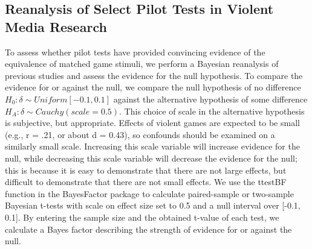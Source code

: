 \documentclass[fignum,nobf,man]{apa}
\begin{document}
\subsection{Reanalysis of Select Pilot Tests in Violent Media Research}
To assess whether pilot tests have provided convincing evidence of the equivalence of matched game stimuli, we perform a Bayesian reanalysis of previous studies and assess the evidence for the null hypothesis. To compare the evidence for or against the null, we compare the null hypothesis of no difference $H_0: \delta \sim Uniform[-0.1, 0.1]$ %
against the alternative hypothesis of some difference $H_A: \delta \sim Cauchy(scale = 0.5)$. This choice of scale in the alternative hypothesis is subjective, but appropriate. Effects of violent games are expected to be small (e.g., r = .21, or about d = 0.43), so confounds should be examined on a similarly small scale. Increasing this scale variable will increase evidence for the null, while decreasing this scale variable will decrease the evidence for the null; this is because it is easy to demonstrate that there are not large effects, but difficult to demonstrate that there are not small effects. %
We use the ttestBF function in the BayesFactor package \citep{Morey:Rouder:2014} to calculate paired-sample or two-sample Bayesian t-tests with scale on effect size set to 0.5 and a null interval over [-0.1, 0.1]. By entering the sample size and the obtained t-value of each test, we calculate a Bayes factor describing the strength of evidence for or against the null.  
\end{document}
